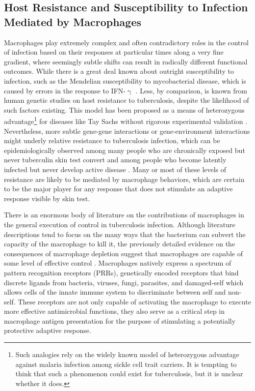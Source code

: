 \subsection{Host Resistance and Susceptibility to Infection Mediated by Macrophages}\label{macsig}

Macrophages play extremely complex and often contradictory roles in the control of infection based on their responses at particular times along a very fine gradient, where seemingly subtle shifts can result in radically different functional outcomes. While there is a great deal known about outright susceptibility to infection, such as the Mendelian susceptibility to mycobacterial disease, which is caused by errors in the response to IFN\hyp{}$\upgamma$ \citep{Bustamante2014}. Less, by comparison, is known from human genetic studies on host resistance to tuberculosis, despite the likelihood of such factors existing. This model has been proposed as a means of heterozygous advantage\footnote{Such analogies rely on the widely known model of heterozygous advantage against malaria infection among sickle cell trait carriers. It is tempting to think that such a phenomenon could exist for tuberculosis, but it is unclear whether it does.} for diseases like Tay Sachs without rigorous experimental validation \citep{Spyropoulous1981}. Nevertheless, more subtle gene\hyp{}gene interactions or gene\hyp{}environment interactions might underly relative resistance to tuberculosis infection, which can be epidemiologically observed among many people who are chronically exposed but never tuberculin skin test convert and among people who become latently infected but never develop active disease \citep{Flynn2011, Orme2015}. Many or most of these levels of resistance are likely to be mediated by macrophage behaviors, which are certain to be the major player for any response that does not stimulate an adaptive response visible by skin test.

There is an enormous body of literature on the contributions of macrophages in the general execution of control in tuberculosis infection. Although literature descriptions tend to focus on the many ways that the bacterium can subvert the capacity of the macrophage to kill it, the previously detailed evidence on the consequences of macrophage depletion suggest that macrophages are capable of some level of effective control \citep{Pagan2015}. Macrophages natively express a spectrum of pattern recognition receptors (PRRs), genetically encoded receptors that bind discrete ligands from bacteria, viruses, fungi, parasites, and damaged\hyp{}self which allows cells of the innate immune system to discriminate between self and non\hyp{}self. These receptors are not only capable of activating the macrophage to execute more effective antimicrobial functions, they also serve as a critical step in macrophage antigen presentation for the purpose of stimulating a potentially protective adaptive response. 

